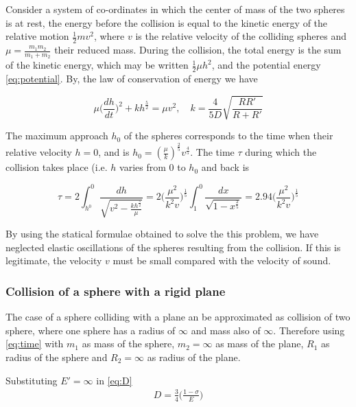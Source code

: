 Consider a system of co-ordinates in which the center of mass of the two spheres is at rest, the energy before the collision is equal to the kinetic energy of the relative motion $\frac{1}{2}mv^{2}$, where $v$ is the relative velocity of the colliding spheres and $\mu = \frac{m_{1}m_{2}}{m_{1} + m_{2}}$ their reduced mass. During the collision, the total energy is the sum of the kinetic energy, which may be written $\frac{1}{2}\mu h^{2}$, and the potential energy \ref{eq:potential}. By, the law of conservation of energy we have

\begin{equation}
\mu \Big( \frac{dh}{dt} \Big) ^{2} + kh^{\frac{5}{2}} = \mu v^{2}, \quad k=\frac{4}{5D}\sqrt{\frac{RR'}{R+R'}}
\label{eq:mass}
\end{equation}


The maximum approach $h_{0}$ of the spheres corresponds to the time when their relative velocity $h = 0$, and is $h_{0} = (\frac{\mu}{k})^{\frac{2}{5}} v^{\frac{4}{5}}$.
The time $\tau$ during which the collision takes place (i.e. $h$ varies from 0 to $h_{0}$ and back is

\begin{equation}
\tau = 2 \int_{h^{0}}^{0} \frac{dh}{\sqrt{v^{2} - \frac{kh^{\frac{5}{2}}}{\mu} }} = 2 \Big( \frac{\mu^{2}}{k^{2}v} \Big) ^{\frac{1}{5}} \int_{1}^{0} \frac{dx}{\sqrt{1-x^{\frac{2}{5}}}} = 2.94 \Big( \frac{\mu^{2}}{k^{2}v} \Big) ^{\frac{1}{5}}
\label{eq:time}
\end{equation}
 
By using the statical formulae obtained to solve the this problem, we have neglected elastic oscillations of the spheres resulting from the collision. If this is legitimate, the velocity $v$ must be small compared with the velocity of sound.


\subsubsection{Collision of a sphere with a rigid plane}

The case of a sphere colliding with a plane an be approximated as collision of two sphere, where one sphere has a radius of $\infty$ and mass also of $\infty$. Therefore using \ref{eq:time} with $m_{1}$ as mass of the sphere, $m_{2}=\infty$ as mass of the plane, $R_{1}$ as radius of the sphere and $R_{2}=\infty$ as radius of the plane.

Substituting $E'=\infty$ in \ref{eq:D}
\begin{align*}
D = \frac{3}{4} \Big( \frac{1 - \sigma}{E} \Big)
\end{align*}


